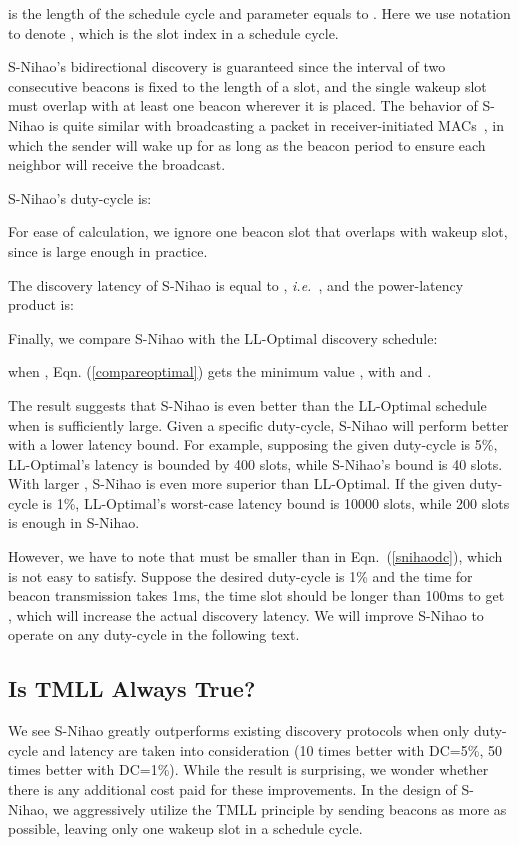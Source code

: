 \documentclass[conference]{IEEEtran}
\begin{document}
 is the length of the schedule cycle and parameter  equals to .
Here we use  notation to denote , which is the slot index in a schedule cycle.

S-Nihao's bidirectional discovery is guaranteed since the interval of two consecutive beacons is fixed to the length of a slot,
and the single wakeup slot must overlap with at least one beacon wherever it is placed.
The behavior of S-Nihao is quite similar with broadcasting a packet in receiver-initiated MACs~\cite{sun2008rimac}\cite{dutta2010amac}, 
in which the sender will wake up for as long as the beacon period to ensure each neighbor will receive the broadcast.

S-Nihao's duty-cycle is:

For ease of calculation, we ignore one beacon slot that overlaps with wakeup slot, since  is large enough in practice.

The discovery latency of S-Nihao is equal to , \emph{i.e.}\ , and the power-latency product is:


Finally, we compare S-Nihao with the LL-Optimal discovery schedule:

when , Eqn. (\ref{compareoptimal}) gets the minimum value ,
with  and .

The result suggests that S-Nihao is even better than the LL-Optimal schedule when  is sufficiently large.
Given a specific duty-cycle, S-Nihao will perform better with a lower latency bound.
For example, supposing the given duty-cycle is 5\%, LL-Optimal's latency is bounded by 400 slots, while S-Nihao's bound is 40 slots.
With larger , S-Nihao is even more superior than LL-Optimal.
If the given duty-cycle is 1\%, LL-Optimal's worst-case latency bound is 10000 slots,
while 200 slots is enough in S-Nihao.

However, we have to note that  must be smaller than  in Eqn.~(\ref{snihaodc}), which is not easy to satisfy.
Suppose the desired duty-cycle is 1\% and the time for beacon transmission takes 1ms,
the time slot should be longer than 100ms to get , which will increase the actual discovery latency.
We will improve S-Nihao to operate on any duty-cycle in the following text.

\subsection{Is TMLL Always True?}
We see S-Nihao greatly outperforms existing discovery protocols when only duty-cycle and latency are taken into consideration
(10 times better with DC=5\%, 50 times better with DC=1\%).
While the result is surprising, we wonder whether there is any additional cost paid for these improvements.
In the design of S-Nihao, we aggressively utilize the TMLL principle by sending beacons as more as possible, leaving only one wakeup slot in a schedule cycle.
\end{document}

